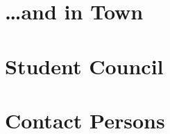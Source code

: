 \documentclass[ngerman,a4paper,openany,twocolumn,showtrims]{memoir}
\begin{document}
\chapter{\dots and in Town}
% 
% 
% 
% 
% 

\chapter{Student Council}
% 
% 
% 
% 

\chapter{Contact Persons}
% 

\end{document}
